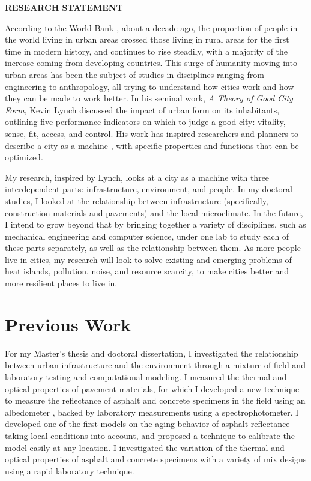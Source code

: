 \documentclass[12pt]{article}
\begin{document}
 \sloppy %

\begin{center}
{\large \uppercase{\textbf{Research Statement}}}
\end{center}

According to the World Bank \cite{Urbanpop19:online}, about a decade ago, the proportion of people in the world living in urban areas crossed those living in rural areas for the first time in modern history, and continues to rise steadily, with a majority of the increase coming from developing countries. This surge of humanity moving into urban areas has been the subject of studies in disciplines ranging from engineering to anthropology, all trying to understand how cities work and how they can be made to work better. In his seminal work, \textit{A Theory of Good City Form}, Kevin Lynch \cite{lynch1984good} discussed the impact of urban form on its inhabitants, outlining five performance indicators on which to judge a good city: vitality, sense, fit, access, and control. His work has inspired researchers and planners to describe a city as a machine \cite{molotch1976city, mcfarlane2011city, lloyd2001city, oke1973city}, with specific properties and functions that can be optimized.

My research, inspired by Lynch, looks at a city as a machine with three interdependent parts: infrastructure, environment, and people. In my doctoral studies, I looked at the relationship between infrastructure (specifically, construction materials and pavements) and the local microclimate. In the future, I intend to grow beyond that by bringing together a variety of disciplines, such as mechanical engineering and computer science, under one lab to study each of these parts separately, as well as the relationship between them. As more people live in cities, my research will look to solve existing and emerging problems of heat islands, pollution, noise, and resource scarcity, to make cities better and more resilient places to live in.

\section*{Previous Work}
For my Master's thesis and doctoral dissertation, I investigated the relationship between urban infrastructure and the environment through a mixture of field and laboratory testing and computational modeling. I measured the thermal and optical properties of pavement materials, for which I developed a new technique to measure the reflectance of asphalt and concrete specimens in the field using an albedometer \cite{sen2018albedo}, backed by laboratory measurements using a spectrophotometer. I developed one of the first models on the aging behavior of asphalt reflectance \cite{sen2016aging} taking local conditions into account, and proposed a technique to calibrate the model easily at any location. I investigated the variation of the thermal and optical properties of asphalt and concrete specimens with a variety of mix designs using a rapid laboratory technique.
\end{document}
